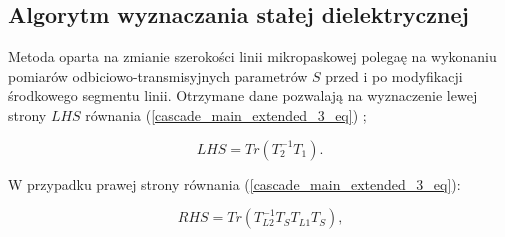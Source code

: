 \subsection{Algorytm wyznaczania stałej dielektrycznej} \label{sec:numerical}

Metoda oparta na zmianie szerokości linii mikropaskowej polegaę na wykonaniu pomiarów odbiciowo-transmisyjnych parametrów $S$ przed i po modyfikacji środkowego segmentu linii. Otrzymane dane pozwalają na wyznaczenie lewej strony $LHS$  równania (\ref{cascade_main_extended_3_eq}) \cite{cite:line_width_method};

   \begin{equation}
    \label{cascade_main_extended_3_lhs_eq}
      LHS=Tr\left(T_2^{-1}T_1\right) \text{.}
 \end{equation}

\noindent W przypadku prawej strony równania (\ref{cascade_main_extended_3_eq}):
 
   \begin{equation}
    \label{cascade_main_extended_3_rhs_eq}
      RHS=Tr\left(T_{L2}^{-1}T_ST_{L1}T_S\right) \text{,}
 \end{equation}

